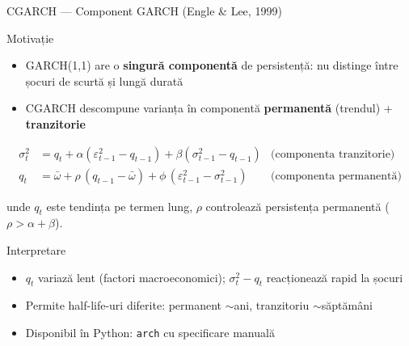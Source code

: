 \documentclass[9pt, aspectratio=169, t]{beamer}
\begin{document}
\begin{frame}{CGARCH --- Component GARCH (Engle \& Lee, 1999)}
    \small
        \begin{block}{Motivație}
            \begin{itemize}
                \item GARCH(1,1) are o \textbf{singură componentă} de persistență: nu distinge între șocuri de scurtă și lungă durată
                \item CGARCH descompune varianța în componentă \textbf{permanentă} (trendul) + \textbf{tranzitorie}
            \end{itemize}
        \end{block}
        \vspace{-1mm}
        \begin{defn}[CGARCH(1,1)]
            \vspace{-2mm}
            \begin{align*}
                \sigma_t^2 &= q_t + \alpha(\varepsilon_{t-1}^2 - q_{t-1}) + \beta(\sigma_{t-1}^2 - q_{t-1}) & \text{(componenta tranzitorie)}\\
                q_t &= \bar{\omega} + \rho\,(q_{t-1} - \bar{\omega}) + \phi\,(\varepsilon_{t-1}^2 - \sigma_{t-1}^2) & \text{(componenta permanentă)}
            \end{align*}
            \vspace{-2mm}

            unde $q_t$ este tendința pe termen lung, $\rho$ controlează persistența permanentă ($\rho > \alpha+\beta$).
        \end{defn}
        \vspace{-1mm}
        \begin{alertblock}{Interpretare}
            \begin{itemize}
                \item $q_t$ variază lent (factori macroeconomici); $\sigma_t^2 - q_t$ reacționează rapid la șocuri
                \item Permite half-life-uri diferite: permanent $\sim$ani, tranzitoriu $\sim$săptămâni
                \item Disponibil în Python: \texttt{arch} cu specificare manuală
            \end{itemize}
        \end{alertblock}
\end{frame}
\end{document}
